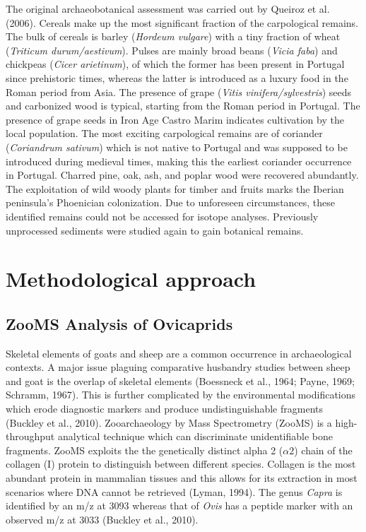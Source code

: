 \documentclass[5p]{elsarticle} %
\begin{document}
The original archaeobotanical assessment was carried out by Queiroz et al. (2006). Cereals make up the most significant fraction of the carpological remains. The bulk of cereals is barley (\emph{Hordeum vulgare}) with a tiny fraction of wheat (\emph{Triticum durum/aestivum}). Pulses are mainly broad beans (\emph{Vicia faba}) and chickpeas (\emph{Cicer arietinum}), of which the former has been present in Portugal since prehistoric times, whereas the latter is introduced as a luxury food in the Roman period from Asia. The presence of grape (\emph{Vitis vinifera/sylvestris}) seeds and carbonized wood is typical, starting from the Roman period in Portugal. The presence of grape seeds in Iron Age Castro Marim indicates cultivation by the local population. The most exciting carpological remains are of coriander (\emph{Coriandrum sativum}) which is not native to Portugal and was supposed to be introduced during medieval times, making this the earliest coriander occurrence in Portugal. Charred pine, oak, ash, and poplar wood were recovered abundantly. The exploitation of wild woody plants for timber and fruits marks the Iberian peninsula's Phoenician colonization. Due to unforeseen circumstances, these identified remains could not be accessed for isotope analyses. Previously unprocessed sediments were studied again to gain botanical remains.

\hypertarget{methodological-approach}{%
\section{Methodological approach}\label{methodological-approach}}

\hypertarget{zooms-analysis-of-ovicaprids}{%
\subsection{ZooMS Analysis of Ovicaprids}\label{zooms-analysis-of-ovicaprids}}

Skeletal elements of goats and sheep are a common occurrence in archaeological contexts. A major issue plaguing comparative husbandry studies between sheep and goat is the overlap of skeletal elements (Boessneck et al., 1964; Payne, 1969; Schramm, 1967). This is further complicated by the environmental modifications which erode diagnostic markers and produce undistinguishable fragments (Buckley et al., 2010). Zooarchaeology by Mass Spectrometry (ZooMS) is a high-throughput analytical technique which can discriminate unidentifiable bone fragments. ZooMS exploits the the genetically distinct alpha 2 (\(\alpha2\)) chain of the collagen (I) protein to distinguish between different species. Collagen is the most abundant protein in mammalian tissues and this allows for its extraction in most scenarios where DNA cannot be retrieved (Lyman, 1994). The genus \emph{Capra} is identified by an m/z at 3093 whereas that of \emph{Ovis} has a peptide marker with an observed m/z at 3033 (Buckley et al., 2010).
\end{document}
